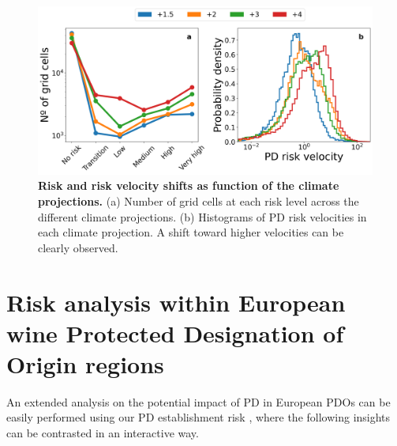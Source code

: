 \begin{figure}[H]
    \centering

    \includegraphics[width=\textwidth]{Figures/Future_risk_velocity_vector_histogram.png}
    \caption[Risk and risk velocity shifts as function of the
        climate projections]{\textbf{Risk and risk velocity shifts as function
            of
            the
            climate projections.} (a) Number of grid cells at each risk level
        across the
        different climate projections. (b) Histograms of PD risk velocities in
        each
        climate projection. A shift toward higher velocities can be clearly
        observed.}
    \label{fig:PD_future_risk_velocity}
\end{figure}

\section{Risk analysis within European wine Protected Designation of Origin
  regions}

An extended analysis on the potential impact of PD in European PDOs can be
easily performed using our PD establishment risk \webpage, where the following
insights can be contrasted in an interactive way.

